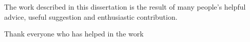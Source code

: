 
\begin{thesisacknowledgments}        %

The work described in this dissertation is the result of many people's helpful advice, useful suggestion and enthusiastic contribution. 

Thank everyone who has helped in the work


\end{thesisacknowledgments}
